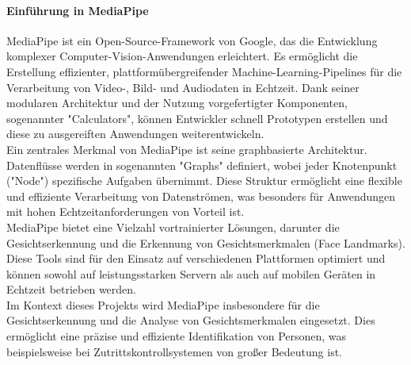\paragraph{Einführung in MediaPipe}
MediaPipe ist ein Open-Source-Framework von Google, das die Entwicklung komplexer Computer-Vision-Anwendungen erleichtert. Es ermöglicht die Erstellung effizienter, plattformübergreifender Machine-Learning-Pipelines für die Verarbeitung von Video-, Bild- und Audiodaten in Echtzeit. Dank seiner modularen Architektur und der Nutzung vorgefertigter Komponenten, sogenannter "Calculators", können Entwickler schnell Prototypen erstellen und diese zu ausgereiften Anwendungen weiterentwickeln.  \\
Ein zentrales Merkmal von MediaPipe ist seine graphbasierte Architektur. Datenflüsse werden in sogenannten "Graphs" definiert, wobei jeder Knotenpunkt ("Node") spezifische Aufgaben übernimmt. Diese Struktur ermöglicht eine flexible und effiziente Verarbeitung von Datenströmen, was besonders für Anwendungen mit hohen Echtzeitanforderungen von Vorteil ist.  \\
MediaPipe bietet eine Vielzahl vortrainierter Lösungen, darunter die Gesichtserkennung und die Erkennung von Gesichtsmerkmalen (Face Landmarks). Diese Tools sind für den Einsatz auf verschiedenen Plattformen optimiert und können sowohl auf leistungsstarken Servern als auch auf mobilen Geräten in Echtzeit betrieben werden. \\
Im Kontext dieses Projekts wird MediaPipe insbesondere für die Gesichtserkennung und die Analyse von Gesichtsmerkmalen eingesetzt. Dies ermöglicht eine präzise und effiziente Identifikation von Personen, was beispielsweise bei Zutrittskontrollsystemen von großer Bedeutung ist.\\

